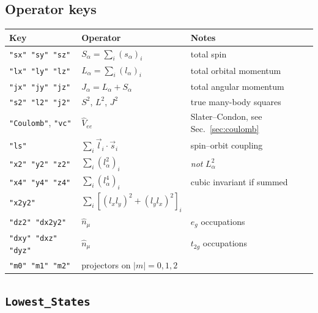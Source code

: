 \documentclass[11pt,a4paper]{article}
\newcommand{\op}[1]{\texttt{#1}}
\begin{document}
\subsection{Operator keys}

\begin{center}
\begin{tabular}{lll}
\toprule
Key & Operator & Notes\\
\midrule
\op{"sx" "sy" "sz"} & $S_\alpha=\sum_i (s_\alpha)_i$ & total spin\\
\op{"lx" "ly" "lz"} & $L_\alpha=\sum_i (l_\alpha)_i$ & total orbital momentum\\
\op{"jx" "jy" "jz"} & $J_\alpha=L_\alpha+S_\alpha$ & total angular momentum\\
\op{"s2" "l2" "j2"} & $S^2$, $L^2$, $J^2$ & true many-body squares\\
\op{"Coulomb"}, \op{"vc"} & $\hat V_{ee}$ & Slater--Condon, see Sec.~\ref{sec:coulomb}\\
\op{"ls"}           & $\sum_i \vec l_i\cdot\vec s_i$ & spin--orbit coupling\\
\op{"x2" "y2" "z2"} & $\sum_i (l_\alpha^2)_i$ & \emph{not} $L_\alpha^2$\\
\op{"x4" "y4" "z4"} & $\sum_i (l_\alpha^4)_i$ & cubic invariant if summed\\
\op{"x2y2"}         & $\sum_i[(l_xl_y)^2+(l_yl_x)^2]_i$ & \\
\op{"dz2" "dx2y2"} & $\hat n_\mu$ & $e_g$ occupations\\
\op{"dxy" "dxz" "dyz"} & $\hat n_\mu$ & $t_{2g}$ occupations\\
\op{"m0" "m1" "m2"} & projectors on $|m|=0,1,2$ & \\
\bottomrule
\end{tabular}
\end{center}

\subsection{\texttt{Lowest\_States}}
\end{document}
